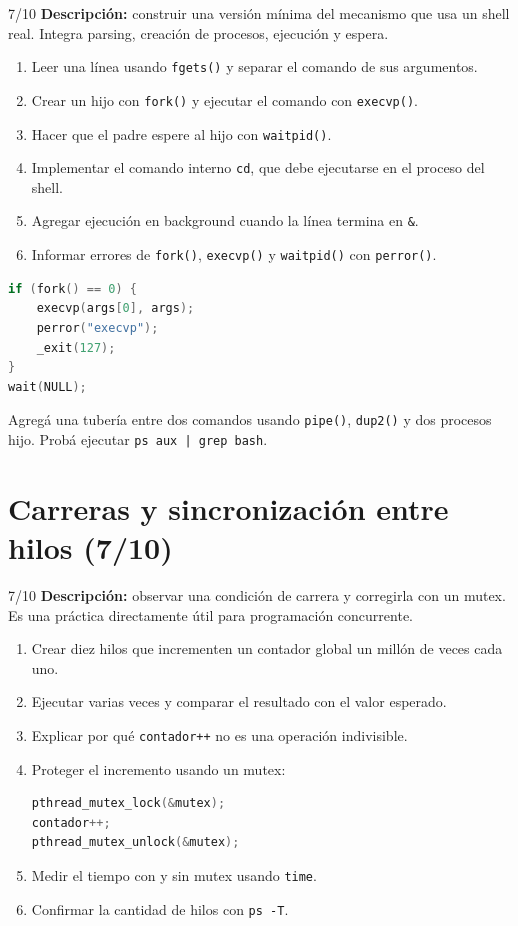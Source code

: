 \documentclass[11pt,a4paper]{article}
\begin{document}
\begin{trackbox}{7/10}
\textbf{Descripción:} construir una versión mínima del mecanismo que usa un shell real. Integra parsing, creación de procesos, ejecución y espera.
\end{trackbox}

\begin{enumerate}
  \item Leer una línea usando \texttt{fgets()} y separar el comando de sus argumentos.
  \item Crear un hijo con \texttt{fork()} y ejecutar el comando con \texttt{execvp()}.
  \item Hacer que el padre espere al hijo con \texttt{waitpid()}.
  \item Implementar el comando interno \texttt{cd}, que debe ejecutarse en el proceso del shell.
  \item Agregar ejecución en background cuando la línea termina en \texttt{\&}.
  \item Informar errores de \texttt{fork()}, \texttt{execvp()} y \texttt{waitpid()} con \texttt{perror()}.
\end{enumerate}

\begin{lstlisting}[language=C]
if (fork() == 0) {
    execvp(args[0], args);
    perror("execvp");
    _exit(127);
}
wait(NULL);
\end{lstlisting}

\begin{pointsextrabox}
Agregá una tubería entre dos comandos usando \texttt{pipe()}, \texttt{dup2()} y dos procesos hijo. Probá ejecutar \texttt{ps aux | grep bash}.
\end{pointsextrabox}

\newpage
\section{Carreras y sincronización entre hilos (7/10)}

\begin{trackbox}{7/10}
\textbf{Descripción:} observar una condición de carrera y corregirla con un mutex. Es una práctica directamente útil para programación concurrente.
\end{trackbox}

\begin{enumerate}
  \item Crear diez hilos que incrementen un contador global un millón de veces cada uno.
  \item Ejecutar varias veces y comparar el resultado con el valor esperado.
  \item Explicar por qué \texttt{contador++} no es una operación indivisible.
  \item Proteger el incremento usando un mutex:
    \begin{lstlisting}[language=C]
pthread_mutex_lock(&mutex);
contador++;
pthread_mutex_unlock(&mutex);
    \end{lstlisting}
  \item Medir el tiempo con y sin mutex usando \texttt{time}.
  \item Confirmar la cantidad de hilos con \texttt{ps -T}.
\end{enumerate}
\end{document}
